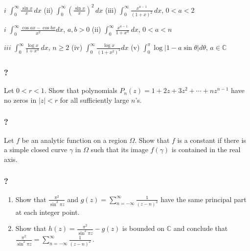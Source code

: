 \(i\) \(\displaystyle \int_0^\infty \frac{\sin x}{x} \, dx\) (ii)
\(\displaystyle \int_0^\infty (\frac{\sin x}{x})^2 \, dx\) (iii)
\(\displaystyle \int_0^\infty \frac{x^{a-1}}{(1 + x)^2} \, dx\),
\(0< a < 2\)

\(i\) \(\displaystyle \int_0^\infty \frac{\cos a x - \cos bx}{x^2} dx\),
\(a, b >0\) (ii)
\(\displaystyle \int_0^\infty \frac{x^{a-1}}{1 + x^n} \, dx\),
\(0< a < n\)

\(iii\) \(\displaystyle \int_0^\infty \frac{\log x}{1 + x^n} \, dx\),
\(n \geq 2\) (iv)
\(\displaystyle \int_0^\infty \frac{\log x}{(1 + x^2)^2} dx\) (v)
\(\displaystyle \int_0^{\pi} \log|1 - a \sin \theta| d \theta\),
\(a \in \mathbb C\)

\hypertarget{section-166}{%
\subsubsection{?}\label{section-166}}

Let \(0<r<1\). Show that polynomials
\(P_n(z) = 1 + 2z + 3 z^2 + \cdots + n z^{n-1}\) have no zeros in
\(|z|<r\) for all sufficiently large \(n\)'s.

\hypertarget{section-167}{%
\subsubsection{?}\label{section-167}}

Let \(f\) be an analytic function on a region \(\Omega\). Show that
\(f\) is a constant if there is a simple closed curve \(\gamma\) in
\(\Omega\) such that its image \(f(\gamma)\) is contained in the real
axis.

\hypertarget{section-168}{%
\subsubsection{?}\label{section-168}}

\begin{enumerate}
\def\labelenumi{(\arabic{enumi})}
\item
  Show that \(\displaystyle \frac{\pi^2}{\sin^2 \pi z}\) and
  \(\displaystyle g(z) = \sum_{n = - \infty}^{ \infty} \frac{1}{(z-n)^2}\)
  have the same principal part at each integer point.
\item
  Show that \(\displaystyle h(z) = \frac{\pi^2}{\sin^2 \pi z} - g(z)\)
  is bounded on \(\mathbb C\) and conclude that
  \(\displaystyle \frac{\pi^2}{\sin^2 \pi z} = \sum_{n = - \infty}^{ \infty} \frac{1}{(z-n)^2} \, .\)
\end{enumerate}

